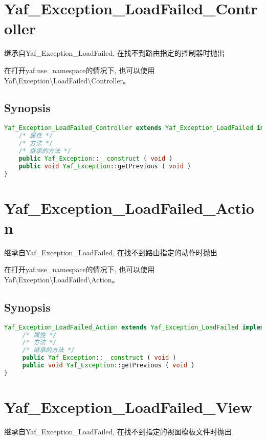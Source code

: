 \chapter{Yaf\_Exception\_LoadFailed\_Controller}


继承自Yaf\_Exception\_LoadFailed, 在找不到路由指定的控制器时抛出

在打开yaf.use\_namespace的情况下, 也可以使用 Yaf\textbackslash Exception\textbackslash LoadFailed\textbackslash Controller。


\section{Synopsis}


\begin{lstlisting}[language=PHP]
Yaf_Exception_LoadFailed_Controller extends Yaf_Exception_LoadFailed implements Throwable {
    /* 属性 */
    /* 方法 */
    /* 继承的方法 */
    public Yaf_Exception::__construct ( void )
    public void Yaf_Exception::getPrevious ( void )
}
\end{lstlisting}

\chapter{Yaf\_Exception\_LoadFailed\_Action}

继承自Yaf\_Exception\_LoadFailed, 在找不到路由指定的动作时抛出

在打开yaf.use\_namespace的情况下, 也可以使用 Yaf\textbackslash Exception\textbackslash LoadFailed\textbackslash Action。

\section{Synopsis}

\begin{lstlisting}[language=PHP]
Yaf_Exception_LoadFailed_Action extends Yaf_Exception_LoadFailed implements Throwable {
     /* 属性 */
     /* 方法 */
     /* 继承的方法 */
     public Yaf_Exception::__construct ( void )
     public void Yaf_Exception::getPrevious ( void )
}
\end{lstlisting}

\chapter{Yaf\_Exception\_LoadFailed\_View}

继承自Yaf\_Exception\_LoadFailed, 在找不到指定的视图模板文件时抛出

